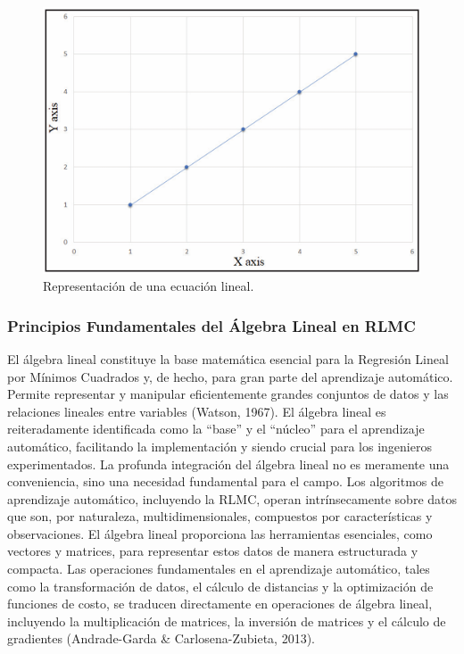 \documentclass[12pt]{article}
\begin{document}
        \begin{figure}[h]
                \centering
                \includegraphics[width=0.7\linewidth]{imagenes/Imagen1}
                \caption{Representación de una ecuación lineal.}
                \label{fig:Imagen1}
        \end{figure}
        
        \subsubsection*{Principios Fundamentales del Álgebra Lineal en RLMC}
        El álgebra lineal constituye la base matemática esencial para la Regresión Lineal por Mínimos Cuadrados y, de hecho, para gran parte del aprendizaje automático. Permite representar y manipular eficientemente grandes conjuntos de datos y las relaciones lineales entre variables (Watson, 1967). El álgebra lineal es reiteradamente identificada como la “base” y el “núcleo” para el aprendizaje automático, facilitando la implementación y siendo crucial para los ingenieros experimentados. La profunda integración del álgebra lineal no es meramente una conveniencia, sino una necesidad fundamental para el campo. Los algoritmos de aprendizaje automático, incluyendo la RLMC, operan intrínsecamente sobre datos que son, por naturaleza, multidimensionales, compuestos por características y observaciones. El álgebra lineal proporciona las herramientas esenciales, como vectores y matrices, para representar estos datos de manera estructurada y compacta. Las operaciones fundamentales en el aprendizaje automático, tales como la transformación de datos, el cálculo de distancias y la optimización de funciones de costo, se traducen directamente en operaciones de álgebra lineal, incluyendo la multiplicación de matrices, la inversión de matrices y el cálculo de gradientes (Andrade-Garda \& Carlosena-Zubieta, 2013).
        
\end{document}
